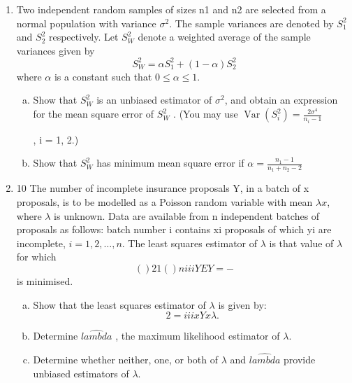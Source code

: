 \documentclass[a4paper,12pt]{article}
\begin{document}
\begin{enumerate}
\item Two independent random samples of sizes n1 and n2 are selected from a normal
population with variance $\sigma^2$. The sample variances are denoted by $S^2_1$ and $S^2_2$
respectively. Let $S^2_W$ denote a weighted average of the sample variances given by
\[ S^2_W = \alpha S^2_1 + (1 - \alpha)S^2_2\]
where $\alpha$ is a constant such that $0 \leq \alpha \leq 1$.
\begin{enumerate}[(a)]
\item Show that $S^2_W$
 is an unbiased estimator of $\sigma^2$, and obtain an expression for
the mean square error of $S^2_W$
 .
(You may use
${ \displaystyle \operatorname{Var}(S^2_i)  = \frac{2 \sigma^4}{n_i - 1} }$ 

, i = 1, 2.) 
\item Show that $S^2_W$
 has minimum mean square error if ${ \displaystyle  \alpha = \frac{n_1 - 1}{ n_1 + n_2 - 2} }$
\end{enumerate}

\item 10 The number of incomplete insurance proposals Y, in a batch of x proposals, is to
be modelled as a Poisson random variable with mean $\lambda x$, where $\lambda$ is unknown.
Data are available from n independent batches of proposals as follows: batch
number i contains xi proposals of which yi are incomplete, $i = 1,2, \ldots, n$.
The least squares estimator of $\lambda$ is that value of $\lambda$for which
\[( )2
1
( )
n
i i
i
Y EY
=
 −\]
is minimised.
\begin{enumerate}[(a)]
\item Show that the least squares estimator of $\lambda$ is given by:
\[2 = i i
i
x Y
x
\lambda
 .\] 
\item Determine $\hat{lambda}$ , the maximum likelihood estimator of $\lambda$. 
\item Determine whether neither, one, or both of $\lambda$ and $\hat{lambda}$ provide unbiased
estimators of $\lambda$. 
\end{enumerate}

\newpage

\newpage




\end{enumerate}
\end{document}
